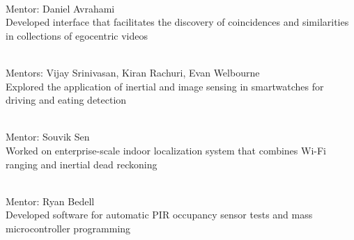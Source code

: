 
 \\
Mentor: Daniel Avrahami \\
Developed interface that facilitates the discovery of coincidences and similarities in collections of egocentric videos
\vspace{5pt}

 \\
Mentors: Vijay Srinivasan, Kiran Rachuri, Evan Welbourne \\
Explored the application of inertial and image sensing in smartwatches for driving and eating detection
\vspace{5pt}

 \\
Mentor: Souvik Sen \\
Worked on enterprise-scale indoor localization system that combines Wi-Fi ranging and inertial dead reckoning
\vspace{5pt}

 \\
Mentor: Ryan Bedell \\
Developed software for automatic PIR occupancy sensor tests and mass microcontroller programming